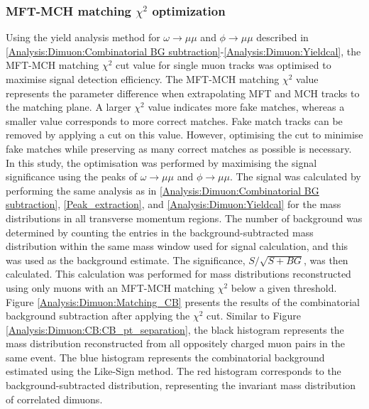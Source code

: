         \subsubsection{MFT-MCH matching $\chi^2$ optimization}
        \label{matching_chi2_opt}
            Using the yield analysis method for $\omega \rightarrow \mu\mu$ and $\phi \rightarrow \mu\mu$ described in \ref{Analysis:Dimuon:Combinatorial BG subtraction}-\ref{Analysis:Dimuon:Yieldcal}, the MFT-MCH matching \(\chi^2\) cut value for single muon tracks was optimised to maximise signal detection efficiency. The MFT-MCH matching \(\chi^2\) value represents the parameter difference when extrapolating MFT and MCH tracks to the matching plane. A larger \(\chi^2\) value indicates more fake matches, whereas a smaller value corresponds to more correct matches. Fake match tracks can be removed by applying a cut on this value. However, optimising the cut to minimise fake matches while preserving as many correct matches as possible is necessary. In this study, the optimisation was performed by maximising the signal significance using the peaks of \(\omega \rightarrow \mu\mu\) and \(\phi \rightarrow \mu\mu\). The signal was calculated by performing the same analysis as in \ref{Analysis:Dimuon:Combinatorial BG subtraction}, \ref{Peak_extraction}, and \ref{Analysis:Dimuon:Yieldcal} for the mass distributions in all transverse momentum regions. The number of background was determined by counting the entries in the background-subtracted mass distribution within the same mass window used for signal calculation, and this was used as the background estimate. The significance, \( S/\sqrt{S+BG} \), was then calculated. This calculation was performed for mass distributions reconstructed using only muons with an MFT-MCH matching \(\chi^2\) below a given threshold. Figure \ref{Analysis:Dimuon:Matching_CB} presents the results of the combinatorial background subtraction after applying the \(\chi^2\) cut. Similar to Figure \ref{Analysis:Dimuon:CB:CB_pt_separation}, the black histogram represents the mass distribution reconstructed from all oppositely charged muon pairs in the same event. The blue histogram represents the combinatorial background estimated using the Like-Sign method. The red histogram corresponds to the background-subtracted distribution, representing the invariant mass distribution of correlated dimuons.
